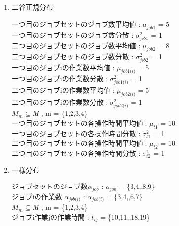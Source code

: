 \documentclass[twocolumn]{jarticle}
\begin{document}
\begin{enumerate}
    \item 二谷正規分布
    
    一つ目のジョブセットのジョブ数平均値 : $\mu_{\textit{job1}}$ = 5\\
    一つ目のジョブセットのジョブ数分散 : $\sigma^2_{\textit{job1}}$ = 1\\
    二つ目のジョブセットのジョブ数平均値 : $\mu_{\textit{job2}}$ = 8\\
    二つ目のジョブセットのジョブ数分散 : $\sigma^2_{\textit{job2}}$ = 1\\
    一つ目のジョブiの作業数平均値 : $\mu_\textit{job1(i)}$ = 5\\
    一つ目のジョブiの作業数分散 : $\sigma^2_\textit{job1(i)}$ = 1\\
    二つ目のジョブiの作業数平均値 : $\mu_\textit{job2(i)}$ = 5\\
    二つ目のジョブiの作業数分散 : $\sigma^2_\textit{job2(i)}$ = 1\\
    $\textit{M}_{\textit{m}} \subseteq \textit{M}$ , m = \{1,2,3,4\}\\
    一つ目のジョブセットの各操作時間平均値 : $\mu_{\textit{t1}}$ = 10\\
    一つ目のジョブセットの各操作時間分散 : $\sigma^2_{\textit{t1}}$ = 1\\
    二つ目のジョブセットの各操作時間平均値 : $\mu_{\textit{t2}}$ = 10\\
    二つ目のジョブセットの各操作時間分散 : $\sigma^2_{\textit{t2}}$ = 1\\

    \item 一様分布
    
    ジョブセットのジョブ数$\alpha_{\textit{job}}$ : $\alpha_{\textit{job}}$ =  \{3,4,\textellipsis,8,9\}\\
    ジョブiの作業数 $\alpha_{\textit{job(i)}}$ : $\alpha_{\textit{job(i)}}$ = \{3,4,\textellipsis,6,7\}\\
    $\textit{M}_{\textit{m}} \subseteq \textit{M}$ , m = \{1,2,3,4\}\\
    ジョブi作業jの作業時間 : $t_{\textit{ij}}$ = \{10,11,\textellipsis,18,19\}\\
    
    \end{enumerate}
\end{document}
